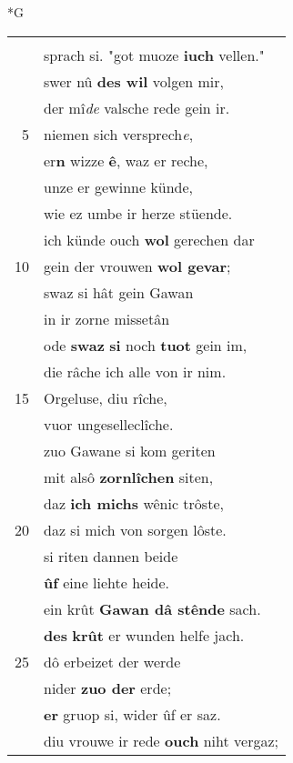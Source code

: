 \documentclass[8pt,a4paper,notitlepage]{article}
\begin{document}
\begin{table}[ht]
\begin{minipage}[t]{0.5\linewidth}
\small
\begin{center}*G
\end{center}
\begin{tabular}{rl}
 & \textit{\begin{large}S\end{large}}us ahtbæren gesellen",\\ 
 & sprach si. "got muoze \textbf{iuch} vellen."\\ 
 & swer nû \textbf{des wil} volgen mir,\\ 
 & der mî\textit{de} valsche rede gein ir.\\ 
5 & niemen sich versprech\textit{e},\\ 
 & er\textbf{n} wizze \textbf{ê}, waz er reche,\\ 
 & unze er gewinne künde,\\ 
 & wie ez umbe ir herze stüende.\\ 
 & ich künde ouch \textbf{wol} gerechen dar\\ 
10 & gein der vrouwen \textbf{wol gevar};\\ 
 & swaz si hât gein Gawan\\ 
 & in ir zorne missetân\\ 
 & ode \textbf{swaz} \textbf{si} noch \textbf{tuot} gein im,\\ 
 & die râche ich alle von ir nim.\\ 
15 & Orgeluse, diu rîche,\\ 
 & vuor ungeselleclîche.\\ 
 & zuo Gawane si kom geriten\\ 
 & mit alsô \textbf{zornlîchen} siten,\\ 
 & daz \textbf{ich michs} wênic trôste,\\ 
20 & daz si mich von sorgen lôste.\\ 
 & si riten dannen beide\\ 
 & \textbf{ûf} eine liehte heide.\\ 
 & ein krût \textbf{Gawan dâ stênde} sach.\\ 
 & \textbf{des} \textbf{krût} er wunden helfe jach.\\ 
25 & dô erbeizet der werde\\ 
 & nider \textbf{zuo der} erde;\\ 
 & \textbf{er} gruop si, wider ûf er saz.\\ 
 & diu vrouwe ir rede \textbf{ouch} niht vergaz;\\ 

\end{tabular}
\end{minipage}
\end{table}
\end{document}

